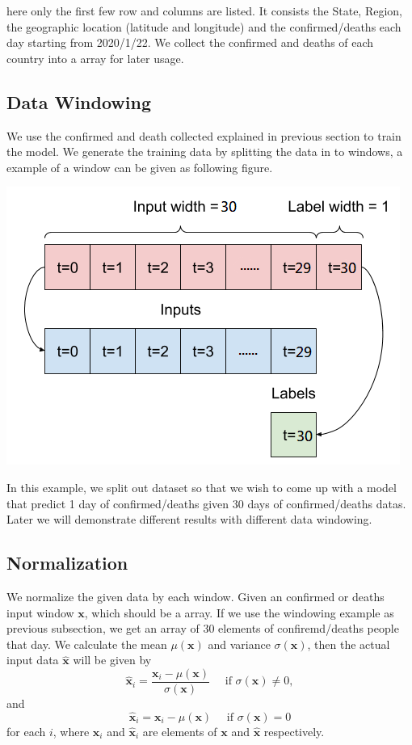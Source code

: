 \documentclass[a4paper,12pt]{article}
\begin{document}
here only the first few row and columns are listed. It consists the State, Region, the geographic location (latitude and longitude) and the confirmed/deaths each day starting from 2020/1/22. We collect the confirmed and deaths of each country into a array for later usage.
\subsection{Data Windowing}
We use the confirmed and death collected explained in previous section to train the model. We generate the training data by splitting the data in to windows, a example of a window can be given as following figure.
\begin{center}
    \includegraphics{split_window.png}
\end{center}
In this example, we split out dataset so that we wish to come up with a model that predict 1 day of confirmed/deaths given 30 days of confirmed/deaths datas. Later we will demonstrate different results with different data windowing.

\subsection{Normalization}
We normalize the given data by each window. Given an confirmed or deaths input window \(\mathbf{x}\), which should be a array. If we use the windowing example as previous subsection, we get an array of $30$ elements of confiremd/deaths people that day. We calculate the mean \(\mu(\mathbf{x})\) and variance \(\sigma(\mathbf{x})\), then the actual input data \(\hat{\mathbf{x}}\) will be given by 
\[\hat{\mathbf{x}}_i = \frac{\mathbf{x}_i - \mu(\mathbf{x})}{\sigma(\mathbf{x})} \quad \text{ if } \sigma(\mathbf{x})\neq 0, \]
and 
\[\hat{\mathbf{x}}_i = \mathbf{x}_i - \mu(\mathbf{x}) \quad \text{ if } \sigma(\mathbf{x})= 0\]
for each \(i\), where \(\mathbf{x}_i\) and \(\hat{\mathbf{x}}_i\) are elements of \(\mathbf{x}\) and \(\hat{\mathbf{x}}\) respectively.
\end{document}
